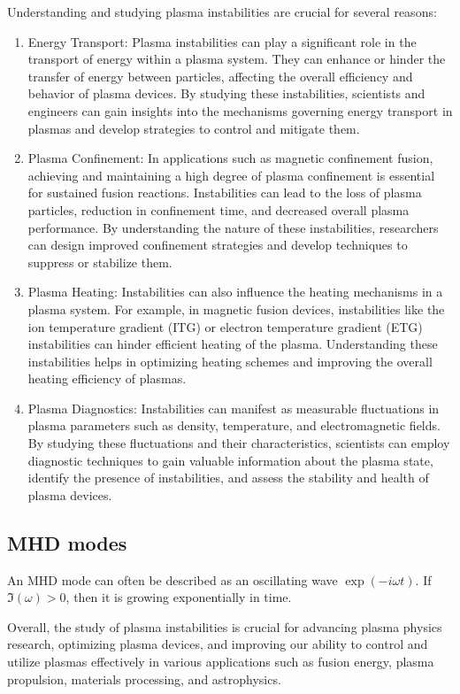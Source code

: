 Understanding and studying plasma instabilities are crucial for several reasons:
\begin{enumerate}
    \item Energy Transport: Plasma instabilities can play a significant role in the transport of energy within a plasma system. They can enhance or hinder the transfer of energy between particles, affecting the overall efficiency and behavior of plasma devices. By studying these instabilities, scientists and engineers can gain insights into the mechanisms governing energy transport in plasmas and develop strategies to control and mitigate them.
    \item Plasma Confinement: In applications such as magnetic confinement fusion, achieving and maintaining a high degree of plasma confinement is essential for sustained fusion reactions. Instabilities can lead to the loss of plasma particles, reduction in confinement time, and decreased overall plasma performance. By understanding the nature of these instabilities, researchers can design improved confinement strategies and develop techniques to suppress or stabilize them.
    \item Plasma Heating: Instabilities can also influence the heating mechanisms in a plasma system. For example, in magnetic fusion devices, instabilities like the ion temperature gradient (ITG) or electron temperature gradient (ETG) instabilities can hinder efficient heating of the plasma. Understanding these instabilities helps in optimizing heating schemes and improving the overall heating efficiency of plasmas.
    \item Plasma Diagnostics: Instabilities can manifest as measurable fluctuations in plasma parameters such as density, temperature, and electromagnetic fields. By studying these fluctuations and their characteristics, scientists can employ diagnostic techniques to gain valuable information about the plasma state, identify the presence of instabilities, and assess the stability and health of plasma devices.
\end{enumerate}

\subsection{MHD modes}
An MHD mode can often be described as an oscillating wave $\exp(-i\omega t)$. If $\Im(\omega) > 0$, then it is growing exponentially in time.


Overall, the study of plasma instabilities is crucial for advancing plasma physics research, optimizing plasma devices, and improving our ability to control and utilize plasmas effectively in various applications such as fusion energy, plasma propulsion, materials processing, and astrophysics.

